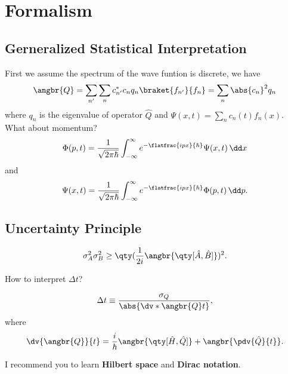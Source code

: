 \section{Formalism}
\subsection{Gerneralized Statistical Interpretation}
First we assume the spectrum of the wave funtion is discrete, we have
\[
	\angbr{Q} =\sum_{n'}\sum_nc^*_{n'}c_nq_n\braket{f_{n'}}{f_n}
	=\sum_n\abs{c_n}^2q_n
\] where $q_n$ is the eigenvalue of operator  $\hat{Q}$ and $\Psi(x,t)=\sum_nc_n(t)f_n(x)$.
What about momentum?
\[
	\Phi(p,t)=\frac{1}{\sqrt{2\pi\hbar}}\int_{-\infty}^{\infty} e^{-\flatfrac{ipx}{\hbar}}\Psi(x,t) \,\dd x
\] and 
\[
    \Psi(x,t)=\frac{1}{\sqrt{2\pi\hbar}}\int_{-\infty}^{\infty} e^{-\flatfrac{ipx}{\hbar}}\Phi(p,t) \,\dd p
.\] 
\subsection{Uncertainty Principle}
\begin{thm}
	\[
		\sigma_A^2\sigma_B^2\ge \qty(\frac{1}{2i}\angbr{\qty[\hat{A},\hat{B}]})^2
	.\] 
\end{thm}
How to interpret $ \Delta t$?
\begin{defi}
 	\[
		\Delta t\equiv\frac{\sigma_Q}{\abs{\dv*{\angbr{Q}}{t}}}
 	,\] where
	\[
		\dv{\angbr{Q}}{t}=
		\frac{i}{\hbar}\angbr{\qty[\hat{H},\hat{Q}]}+\angbr{\pdv{\hat{Q}}{t}}
	.\] 
\end{defi}
I recommend you to learn \textbf{Hilbert space} and \textbf{Dirac notation}.
